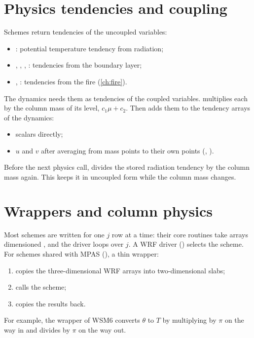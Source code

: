\section{Physics tendencies and coupling}

Schemes return tendencies of the uncoupled variables:
\begin{itemize}
  \item {}: potential temperature tendency from radiation;
  \item {}, , , : tendencies from the boundary layer;
  \item {}, : tendencies from the fire (\cref{ch:fire}).
\end{itemize}
The dynamics needs them as tendencies of the coupled variables. 
multiplies each by the column mass of its level, $c_1\mu + c_2$. Then 
adds them to the tendency arrays of the dynamics:
\begin{itemize}
  \item scalars directly;
  \item $u$ and $v$ after averaging from mass points to their own points (, ).
\end{itemize}
Before the next physics call,  divides the stored radiation tendency by the column mass again.
This keeps it in uncoupled form while the column mass changes.

\section{Wrappers and column physics}

Most schemes are written for one $j$ row at a time: their core routines take arrays dimensioned , and the driver loops over $j$. A WRF driver () selects the scheme. For schemes
shared with MPAS (), a thin wrapper:
\begin{enumerate}
  \item copies the three-dimensional WRF arrays into two-dimensional slabs;
  \item calls the scheme;
  \item copies the results back.
\end{enumerate}
For example, the wrapper of WSM6 converts $\theta$ to $T$ by multiplying by $\pi$ on the way in and divides by $\pi$
on the way out.

